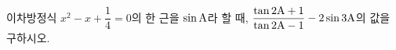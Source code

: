 이차방정식 $x^2-x+\dfrac{1}{4}=0$의 한 근을 $\sin\mathrm{A}$라 할 때, $\dfrac{\tan 2\mathrm{A}+1}{\tan 2\mathrm{A}-1}-2\sin 3\mathrm{A}$의 값을 구하시오. 
